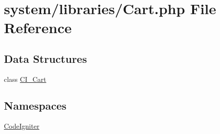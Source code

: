 \hypertarget{_cart_8php}{}\section{system/libraries/\+Cart.php File Reference}
\label{_cart_8php}
\subsection*{Data Structures}
\begin{DoxyCompactItemize}
\item 
class \mbox{\hyperlink{class_c_i___cart}{C\+I\+\_\+\+Cart}}
\end{DoxyCompactItemize}
\subsection*{Namespaces}
\begin{DoxyCompactItemize}
\item 
 \mbox{\hyperlink{namespace_code_igniter}{Code\+Igniter}}
\end{DoxyCompactItemize}
